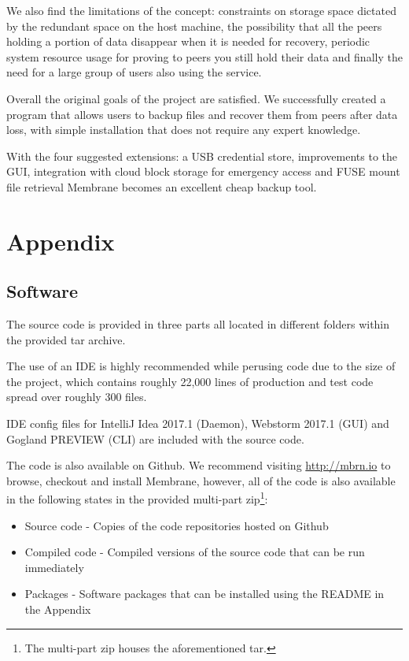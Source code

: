 \documentclass[11pt, a4paper, twoside]{report}
\begin{document}
We also find the limitations of the concept: constraints on storage space dictated by the redundant space on the host machine, the possibility that all the peers holding a portion of data disappear when it is needed for recovery, periodic system resource usage for proving to peers you still hold their data and finally the need for a large group of users also using the service.

Overall the original goals of the project are satisfied. We successfully created a program that allows users to backup files and recover them from peers after data loss, with simple installation that does not require any expert knowledge.

With the four suggested extensions: a USB credential store, improvements to the GUI, integration with cloud block storage for emergency access and FUSE mount file retrieval Membrane becomes an excellent cheap backup tool.



\newpage

\chapter{Appendix}

\section{Software}

The source code is provided in three parts all located in different folders within the provided tar archive.

The use of an IDE is highly recommended while perusing code due to the size of the project, which contains roughly 22,000 lines of production and test code spread over roughly 300 files.

IDE config files for IntelliJ Idea 2017.1 (Daemon), Webstorm 2017.1 (GUI) and Gogland PREVIEW (CLI) are included with the source code.

The code is also available on Github. We recommend visiting \url{http://mbrn.io} to browse, checkout and install Membrane, however, all of the code is also available in the following states in the provided multi-part zip\footnote{The multi-part zip houses the aforementioned tar.}:

\begin{itemize}
 \item Source code - Copies of the code repositories hosted on Github
 \item Compiled code - Compiled versions of the source code that can be run immediately
 \item Packages - Software packages that can be installed using the README in the Appendix 
\end{itemize}
\end{document}
